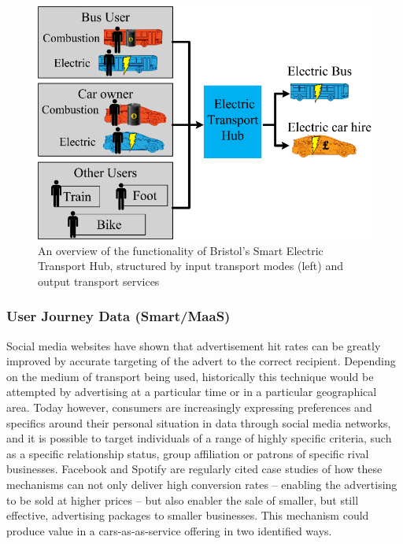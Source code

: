 \documentclass[journal]{IEEEtran}
\begin{document}
\begin{figure}[!htb]
\centering
\includegraphics[width=\columnwidth]{images/bristolhub.png}
\caption{An overview of the functionality of Bristol's Smart Electric
  Transport Hub, structured by input transport modes (left) and output
  transport services}
\label{fig:bristolhub}
\end{figure}


\subsubsection{User Journey Data (Smart/MaaS)}

Social media websites have shown that advertisement hit rates can be
greatly improved by accurate targeting of the advert to the correct
recipient. Depending on the medium of transport being used,
historically this technique would be attempted by advertising at a
particular time or in a particular geographical area. Today however,
consumers are increasingly expressing preferences and specifics around
their personal situation in data through social media networks, and it
is possible to target individuals of a range of highly specific
criteria, such as a specific relationship status, group affiliation or
patrons of specific rival businesses.  Facebook and Spotify are
regularly cited case studies of how these mechanisms can not only
deliver high conversion rates -- enabling the advertising to be sold at
higher prices – but also enabler the sale of smaller, but still
effective, advertising packages to smaller businesses. This mechanism
could produce value in a cars-as-as-service offering in two identified
ways.
\end{document}
